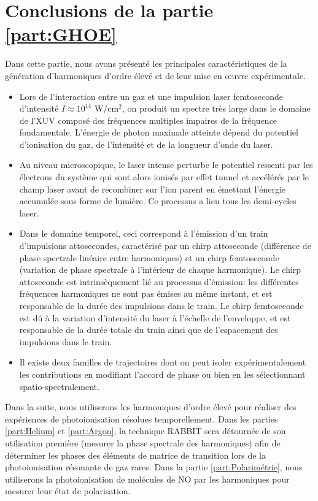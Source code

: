 \section*{Conclusions de la partie \ref{part:GHOE}}
Dans cette partie, nous avons présenté les principales caractéristiques de la génération d'harmoniques d'ordre élevé et de leur mise en \oe uvre expérimentale. 
\begin{itemize}
\item Lors de l'interaction entre un gaz et une impulsion laser femtoseconde d'intensité $I \approx 10^{14}$ W/cm$^2$, on produit un spectre très large dans le domaine de l'XUV composé des fréquences multiples impaires de la fréquence fondamentale. L'énergie de photon maximale atteinte dépend du potentiel d'ionisation du gaz, de l'intensité et de la longueur d'onde du laser.
\item Au niveau microscopique, le laser intense perturbe le potentiel ressenti par les électrons du système qui sont alors ionisés par effet tunnel et accélérés par le champ laser avant de recombiner sur l'ion parent en émettant l'énergie accumulée sous forme de lumière. Ce processus a lieu tous les demi-cycles laser.
\item Dans le domaine temporel, ceci correspond à l'émission d'un train d'impulsions attosecondes, caractérisé par un chirp attoseconde (différence de phase spectrale linéaire entre harmoniques) et un chirp femtoseconde (variation de phase spectrale à l'intérieur de chaque harmonique). Le chirp attoseconde est intrinsèquement lié au processus d'émission: les différentes fréquences harmoniques ne sont pas émises au même instant, et est responsable de la durée des impulsions dans le train. Le chirp femtoseconde est dû à la variation d'intensité du laser à l'échelle de l'enveloppe, et est responsable de la durée totale du train ainsi que de l'espacement des impulsions dans le train.
\item Il existe deux familles de trajectoires dont on peut isoler expérimentalement les contributions en modifiant l'accord de phase ou bien en les sélectionnant spatio-spectralement.
\end{itemize}

Dans la suite, nous utiliserons les harmoniques d'ordre élevé pour réaliser des expériences de photoionisation résolues temporellement. Dans les parties \ref{part:Helium} et \ref{part:Argon}, la technique RABBIT sera détournée de son utilisation première (mesurer la phase spectrale des harmoniques) afin de déterminer les phases des éléments de matrice de transition lors de la photoionisation résonante de gaz rares. Dans la partie \ref{part:Polarimétrie}, nous utiliserons la photoionisation de molécules de NO par les harmoniques pour mesurer leur état de polarisation.